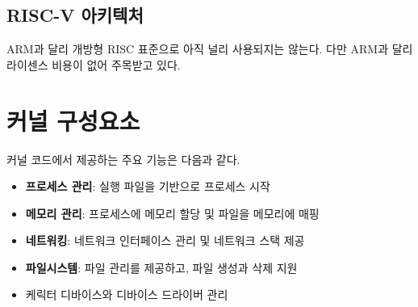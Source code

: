 \subsection{RISC-V 아키텍처}
\begin{flushleft}
    ARM과 달리 개방형 RISC 표준으로 아직 널리 사용되지는 않는다. 
    다만 ARM과 달리 라이센스 비용이 없어 주목받고 있다.
\end{flushleft}


\section{커널 구성요소}
커널 코드에서 제공하는 주요 기능은 다음과 같다.

\begin{itemize}
    \item \textbf{프로세스 관리}: 실행 파일을 기반으로 프로세스 시작
    \item \textbf{메모리 관리}: 프로세스에 메모리 할당 및 파일을 메모리에 매핑
    \item \textbf{네트워킹}: 네트워크 인터페이스 관리 및 네트워크 스택 제공
    \item \textbf{파일시스템}: 파일 관리를 제공하고, 파일 생성과 삭제 지원
    \item 케릭터 디바이스와 디바이스 드라이버 관리
\end{itemize}

